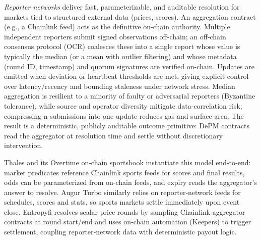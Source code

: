 \textit{Reporter networks} deliver fast, parameterizable, and auditable resolution for markets tied to structured external data (prices, scores). An aggregation contract (e.g., a Chainlink feed) acts as the definitive on-chain authority. Multiple independent reporters submit signed observations off-chain; an off‑chain consensus protocol (OCR) coalesces these into a single report whose value is typically the median (or a mean with outlier filtering) and whose metadata (round ID, timestamp) and quorum signatures are verified on-chain. Updates are emitted when deviation or heartbeat thresholds are met, giving explicit control over latency/recency and bounding staleness under network stress. Median aggregation is resilient to a minority of faulty or adversarial reporters (Byzantine tolerance), while source and operator diversity mitigate data‑correlation risk; compressing n submissions into one update reduces gas and surface area. The result is a deterministic, publicly auditable outcome primitive: DePM contracts read the aggregator at resolution time and settle without discretionary intervention.

Thales and its Overtime on‑chain sportsbook instantiate this model end‑to‑end: market predicates reference Chainlink sports feeds for scores and final results, odds can be parameterized from on‑chain feeds, and expiry reads the aggregator’s answer to resolve. Augur Turbo similarly relies on reporter‑network feeds for schedules, scores and stats, so sports markets settle immediately upon event close. Entropyfi resolves scalar price rounds by sampling Chainlink aggregator contracts at round start/end and uses on‑chain automation (Keepers) to trigger settlement, coupling reporter‑network data with deterministic payout logic. 





